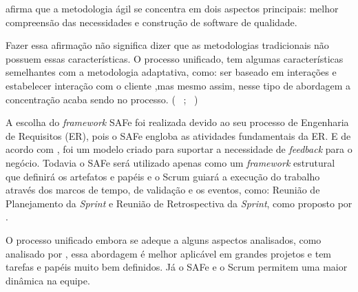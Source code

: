  afirma que a metodologia ágil se concentra em dois aspectos principais: 
melhor compreensão das necessidades e construção de software de qualidade. 

Fazer essa afirmação não significa dizer que as metodologias tradicionais não possuem essas características. O processo unificado, 
tem algumas características semelhantes com a metodologia adaptativa, como: ser baseado em interações e estabelecer interação com o cliente
,mas mesmo assim, nesse tipo de abordagem a concentração acaba sendo no processo. (~\cite{safe} ; ~\cite{vasco})

A escolha do \textit{framework} SAFe foi realizada devido ao seu processo de Engenharia de Requisitos (ER), pois o SAFe engloba as atividades
fundamentais da ER. E de acordo com , foi um modelo criado para suportar a necessidade de \textit{feedback}
para o negócio. Todavia o SAFe será utilizado apenas como um \textit{framework} estrutural que definirá os artefatos e papéis e o Scrum guiará
a execução do trabalho através dos marcos de tempo, de validação e os eventos, como: Reunião de Planejamento da \textit{Sprint} e 
Reunião de Retrospectiva da \textit{Sprint}, como proposto por .

O processo unificado embora se adeque a alguns aspectos analisados, como analisado por ,
essa abordagem é melhor  aplicável em grandes projetos e tem tarefas e papéis muito bem definidos.
Já o SAFe e o Scrum permitem uma maior dinâmica na equipe.


